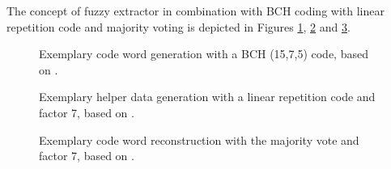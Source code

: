 The concept of fuzzy extractor in combination with BCH coding with linear repetition code and majority voting is depicted in Figures \ref{img:4_BCH_concept}, \ref{img:4_LR_HD} and \ref{img:4_MV_codewords}.

\begin{figure}[h]
\centering
{}
\caption{Exemplary code word generation with a BCH (15,7,5) code, based on \cite{10}.}
\label{img:4_BCH_concept}
\end{figure}

\begin{figure}[h]
\centering
{}
\caption{Exemplary helper data generation with a linear repetition code and factor 7, based on \cite{10}.}
\label{img:4_LR_HD}
\end{figure}

\begin{figure}[h]
\centering
{}
\caption{Exemplary code word reconstruction with the majority vote and factor 7, based on \cite{10}.}
\label{img:4_MV_codewords}
\end{figure}

